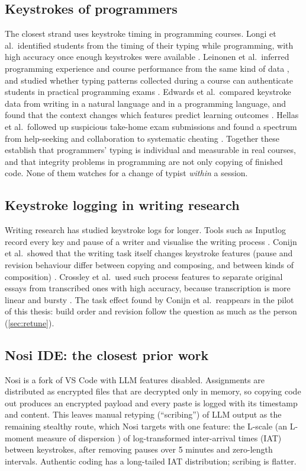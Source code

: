 \subsection{Keystrokes of programmers}
The closest strand uses keystroke timing in programming courses. Longi et al.\
identified students from the timing of their typing while programming, with
high accuracy once enough keystrokes were available
\cite{longi2015identification}. Leinonen et al.\ inferred programming
experience and course performance from the same kind of data
\cite{leinonen2016inference}, and studied whether typing patterns collected
during a course can authenticate students in practical programming exams
\cite{leinonen2016exams}. Edwards et al.\ compared keystroke data from writing
in a natural language and in a programming language, and found that the
context changes which features predict learning outcomes
\cite{edwards2020keystroke}. Hellas et al.\ followed up suspicious take-home
exam submissions and found a spectrum from help-seeking and collaboration to
systematic cheating \cite{hellas2017plagiarism}. Together these establish that
programmers' typing is individual and measurable in real courses, and that
integrity problems in programming are not only copying of finished code. None
of them watches for a change of typist \emph{within} a session.

\subsection{Keystroke logging in writing research}
Writing research has studied keystroke logs for longer. Tools such as Inputlog
record every key and pause of a writer and visualise the writing process
\cite{leijten2013inputlog}. Conijn et al.\ showed that the writing task itself
changes keystroke features (pause and revision behaviour differ between
copying and composing, and between kinds of composition)
\cite{conijn2019keystroke}. Crossley et al.\ used such process features to
separate original essays from transcribed ones with high accuracy, because
transcription is more linear and bursty \cite{crossley2024plagiarism}. The task
effect found by Conijn et al.\ reappears in the pilot of this thesis: build
order and revision follow the question as much as the person
(\cref{sec:retune}).

\subsection{Nosi IDE: the closest prior work}
Nosi \cite{lueder2026nosi} is a fork of VS Code with LLM features disabled.
Assignments are distributed as encrypted files that are decrypted only in
memory, so copying code out produces an encrypted payload and every paste
is logged with its timestamp and content. This leaves manual retyping
(``scribing'') of LLM output as the remaining stealthy route, which Nosi
targets with one feature: the L-scale (an L-moment measure of dispersion
\cite{hosking1990lmoments}) of log-transformed inter-arrival times (IAT)
between keystrokes, after removing pauses over 5 minutes and zero-length
intervals. Authentic coding has a long-tailed IAT distribution; scribing is
flatter.


